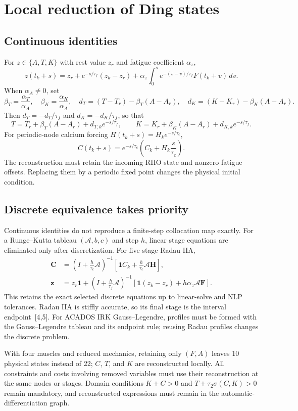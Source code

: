 \documentclass[10pt]{article}
\begin{document}
\section{Local reduction of Ding states}

\subsection{Continuous identities}

For $z\in\{A,T,K\}$ with rest value $z_r$ and fatigue coefficient $\alpha_z$,
\[
z(t_k+s)=z_r+e^{-s/\tau_f}(z_k-z_r)
+\alpha_z\int_0^s e^{-(s-v)/\tau_f}F(t_k+v)\,dv.
\]
When $\alpha_A\neq 0$, set
\[
\beta_T=\frac{\alpha_T}{\alpha_A},\quad
\beta_K=\frac{\alpha_K}{\alpha_A},\quad
d_T=(T-T_r)-\beta_T(A-A_r),\quad
d_K=(K-K_r)-\beta_K(A-A_r).
\]
Then $\dot d_T=-d_T/\tau_f$ and $\dot d_K=-d_K/\tau_f$, so that
\[
T=T_r+\beta_T(A-A_r)+d_{T,k}e^{-s/\tau_f}, \qquad
K=K_r+\beta_K(A-A_r)+d_{K,k}e^{-s/\tau_f}.
\]
For periodic-node calcium forcing $H(t_k+s)=H_k e^{-s/\tau_c}$,
\[
C(t_k+s)=e^{-s/\tau_c}\left(C_k+H_k\frac{s}{\tau_c}\right).
\]
The reconstruction must retain the incoming RHO state and nonzero fatigue offsets. Replacing them by a periodic fixed point changes the physical initial condition.

\subsection{Discrete equivalence takes priority}

Continuous identities do not reproduce a finite-step collocation map exactly. For a Runge--Kutta tableau $(\mathcal{A},b,c)$ and step $h$, linear stage equations are eliminated only after discretization. For five-stage Radau IIA,
\begin{align}
\mathbf C &= \left(I+\frac{h}{\tau_c}\mathcal A\right)^{-1}
\left[\mathbf 1 C_k+\frac{h}{\tau_c}\mathcal A\mathbf H\right],\\
\mathbf z &= z_r\mathbf 1+
\left(I+\frac{h}{\tau_f}\mathcal A\right)^{-1}
\left[\mathbf 1(z_k-z_r)+h\alpha_z\mathcal A\mathbf F\right].
\end{align}
This retains the exact selected discrete equations up to linear-solve and NLP tolerances. Radau IIA is stiffly accurate, so its final stage is the interval endpoint~[4,5]. For ACADOS IRK Gauss--Legendre, profiles must be formed with the Gauss--Legendre tableau and its endpoint rule; reusing Radau profiles changes the discrete problem.

With four muscles and reduced mechanics, retaining only $(F,A)$ leaves 10 physical states instead of 22; $C$, $T$, and $K$ are reconstructed locally. All constraints and costs involving removed variables must use their reconstruction at the same nodes or stages. Domain conditions $K+C>0$ and $T+\tau_2\sigma(C,K)>0$ remain mandatory, and reconstructed expressions must remain in the automatic-differentiation graph.
\end{document}

